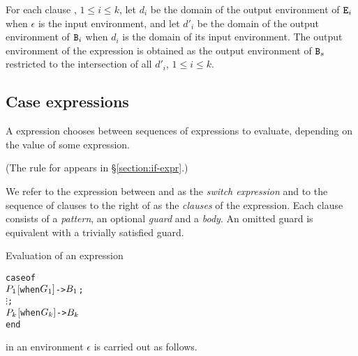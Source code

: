 \ENVIRONMENTS

For each clause , $1\leq i\leq k$, let $d_i$
be the domain of the output environment of ${\tt{\sl E}}_i$ when $\epsilon$
is the input environment, and let $d'_i$ be the domain of the output
environment of ${\tt{\sl B}}_i$ when $d_i$ is the domain of its input
environment.  The output environment of the 
expression is obtained as the output environment of ${\tt{\sl B}}_s$
restricted to the intersection of all $d'_i$, $1\leq i\leq k$.
\fi	%

\subsection{Case expressions}

\label{section:case-expr}

A  expression chooses between sequences of expressions to
evaluate, depending on the value of some expression.

\SYNTAX

\begin{rules}
       {   \NT{\CrtClauses} }

\grrule{\CrtClauses}
       {\NT{\CrtClause} \OR
        \NT{\CrtClauses} \TXT{;} \NT{\CrtClause}}

\grrule{\CrtClause}
       {  }

       { }

       {}
\end{rules}
(The rule for  appears in \S\ref{section:if-expr}.)

We refer to the expression between  and  as the \emph{switch
expression} and to the sequence of clauses to the right of  as
the \emph{clauses} of the  expression.  Each clause consists
of a \emph{pattern}, an optional \emph{guard} and a \emph{body}.
An omitted guard is equivalent with a trivially satisfied  guard.

\EVALUATION

Evaluation of an expression
\begin{alltt}
case  of
    \(\Z{P}\sb{1}\) \([\)when \(\Z{G}\sb{1}]\) -> \(\Z{B}\sb{1}\) ;
    \(\vdots\) ;
    \(\Z{P}\sb{k}\) \([\)when \(\Z{G}\sb{k}]\) -> \(\Z{B}\sb{k}\)
end
\end{alltt}
in an environment $\epsilon$ is carried out as follows.

